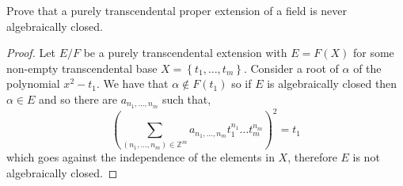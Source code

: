 \documentclass[11pt]{article}
\newenvironment{problem}[2][Problem\!]{\begin{tcolorbox}\begin{trivlist}
\item[\hskip \labelsep {\bfseries #1}\hskip \labelsep {\bfseries #2}]}{\end{trivlist}\end{tcolorbox}}
\newcommand{\zz}{\mathbb Z}   %
\newcommand{\set}[1]{\left\{#1\right\}} %
\newcommand{\lrp}[1]{\left(#1\right)}
\begin{document}
\newpage

\begin{problem} {14.9.10}
    Prove that a purely transcendental proper extension of a field is never algebraically closed.
\end{problem}
\begin{proof}
    Let $E/F$ be a purely transcendental extension with $E = F(X)$ for some non-empty transcendental base $X = \set{t_1, \dots, t_m}.$ Consider a root of $\alpha$ of the polynomial $x^{2} -t_1$. We have that $\alpha \notin F(t_1)$ so if $E$ is algebraically closed then $\alpha \in E$ and so there are $a_{n_1, \dots, n_m}$ such that,
    \[\lrp{\sum_{(n_1,\dots,n_m)\in \zz^{m}}a_{n_1,\dots, n_m}t_1^{n_1}\dots t_m^{n_m} }^{2} = t_1\]
    which goes against the independence of the elements in $X$, therefore $E$ is not algebraically closed. 
\end{proof}

\vspace*{15pt}
\end{document}
